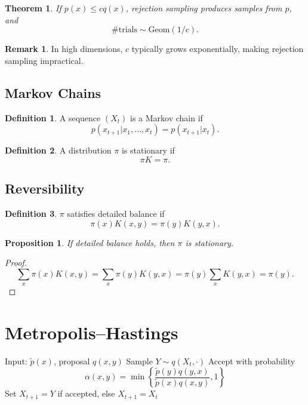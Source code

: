 \documentclass[12pt,oneside]{book}
\numberwithin{equation}{section}
\theoremstyle{definition}
\newtheorem{definition}{Definition}[section]
\newtheorem{remark}{Remark}[section]
\theoremstyle{plain}
\newtheorem{theorem}{Theorem}[section]
\newtheorem{proposition}{Proposition}[section]
\theoremstyle{remark}
\begin{document}
\begin{theorem}
If $p(x) \le c q(x)$, rejection sampling produces samples from $p$, and
\[
\#\text{trials} \sim \mathrm{Geom}(1/c).
\]
\end{theorem}

\begin{remark}
In high dimensions, $c$ typically grows exponentially, making rejection sampling impractical.
\end{remark}


\subsection*{Markov Chains}

\begin{definition}
A sequence $(X_t)$ is a Markov chain if
\[
p(x_{t+1} | x_1,\dots,x_t) = p(x_{t+1} | x_t).
\]
\end{definition}

\begin{definition}
A distribution $\pi$ is stationary if
\[
\pi K = \pi.
\]
\end{definition}


\subsection{Reversibility}

\begin{definition}
$\pi$ satisfies detailed balance if
\[
\pi(x)K(x,y) = \pi(y)K(y,x).
\]
\end{definition}

\begin{proposition}
If detailed balance holds, then $\pi$ is stationary.
\end{proposition}

\begin{proof}
\[
\sum_x \pi(x)K(x,y)
=
\sum_x \pi(y)K(y,x)
=
\pi(y)\sum_x K(y,x)
=
\pi(y).
\]
\end{proof}


\section*{Metropolis--Hastings}

\begin{algorithm}
\caption{Metropolis--Hastings}
\begin{algorithmic}
\State Input: $\tilde{p}(x)$, proposal $q(x,y)$
\State Sample $Y \sim q(X_t,\cdot)$
\State Accept with probability
\[
\alpha(x,y)
=
\min\left\{
\frac{\tilde{p}(y)q(y,x)}{\tilde{p}(x)q(x,y)}, 1
\right\}
\]
\State Set $X_{t+1} = Y$ if accepted, else $X_{t+1} = X_t$
\EndFor
\end{algorithmic}
\end{algorithm}
\end{document}
